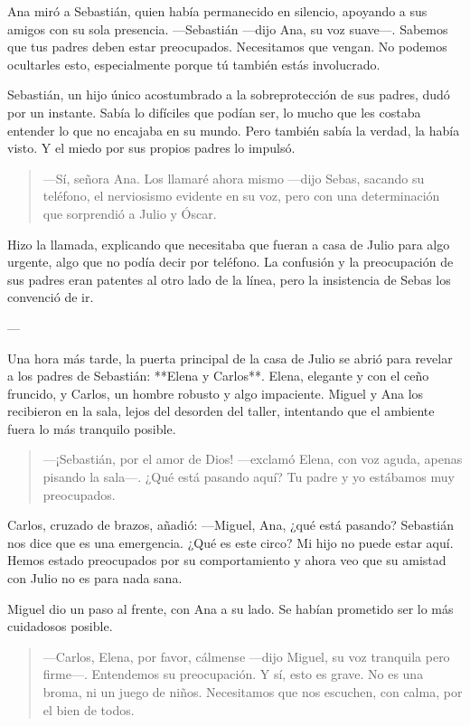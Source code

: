 \documentclass[a4paper,12pt]{book}
\begin{document}
Ana miró a Sebastián, quien había permanecido en silencio, apoyando a sus amigos con su sola presencia. —Sebastián —dijo Ana, su voz suave—. Sabemos que tus padres deben estar preocupados. Necesitamos que vengan. No podemos ocultarles esto, especialmente porque tú también estás involucrado.

Sebastián, un hijo único acostumbrado a la sobreprotección de sus padres, dudó por un instante. Sabía lo difíciles que podían ser, lo mucho que les costaba entender lo que no encajaba en su mundo. Pero también sabía la verdad, la había visto. Y el miedo por sus propios padres lo impulsó.

\begin{quote}
    —Sí, señora Ana. Los llamaré ahora mismo —dijo Sebas, sacando su teléfono, el nerviosismo evidente en su voz, pero con una determinación que sorprendió a Julio y Óscar.
\end{quote}

Hizo la llamada, explicando que necesitaba que fueran a casa de Julio para algo urgente, algo que no podía decir por teléfono. La confusión y la preocupación de sus padres eran patentes al otro lado de la línea, pero la insistencia de Sebas los convenció de ir.

---

Una hora más tarde, la puerta principal de la casa de Julio se abrió para revelar a los padres de Sebastián: **Elena y Carlos**. Elena, elegante y con el ceño fruncido, y Carlos, un hombre robusto y algo impaciente. Miguel y Ana los recibieron en la sala, lejos del desorden del taller, intentando que el ambiente fuera lo más tranquilo posible.

\begin{quote}
    —¡Sebastián, por el amor de Dios! —exclamó Elena, con voz aguda, apenas pisando la sala—. ¿Qué está pasando aquí? Tu padre y yo estábamos muy preocupados.
\end{quote}

Carlos, cruzado de brazos, añadió: —Miguel, Ana, ¿qué está pasando? Sebastián nos dice que es una emergencia. ¿Qué es este circo? Mi hijo no puede estar aquí. Hemos estado preocupados por su comportamiento y ahora veo que su amistad con Julio no es para nada sana.

Miguel dio un paso al frente, con Ana a su lado. Se habían prometido ser lo más cuidadosos posible.

\begin{quote}
    —Carlos, Elena, por favor, cálmense —dijo Miguel, su voz tranquila pero firme—. Entendemos su preocupación. Y sí, esto es grave. No es una broma, ni un juego de niños. Necesitamos que nos escuchen, con calma, por el bien de todos.
\end{quote}
\end{document}
